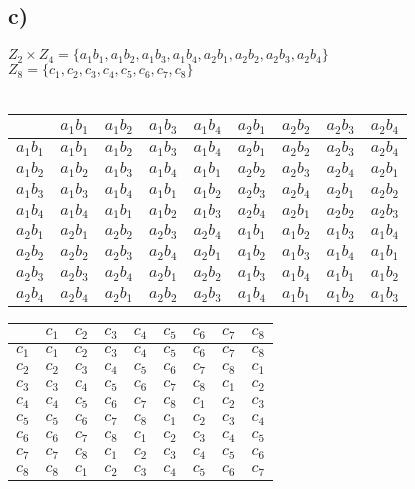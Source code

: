 \documentclass[]{scrartcl}
\begin{document}
\subsection{c)}
$Z_2\times Z_4 = \{a_1b_1, a_1b_2, a_1b_3, a_1b_4, a_2b_1, a_2b_2, a_2b_3, a_2b_4\}$\\
$Z_8 = \{c_1, c_2, c_3, c_4, c_5, c_6, c_7, c_8\}$\\\\
\begin{tabular}{|c||c|c|c|c|c|c|c|c|}
	\hline
	& $a_1b_1$ & $a_1b_2$ & $a_1b_3$ & $a_1b_4$ & $a_2b_1$ & $a_2b_2$ & $a_2b_3$ & $a_2b_4$\\\hline\hline
	$a_1b_1$ & $a_1b_1$ & $a_1b_2$ & $a_1b_3$ & $a_1b_4$ & $a_2b_1$ & $a_2b_2$ & $a_2b_3$ & $a_2b_4$ \\\hline
	$a_1b_2$ & $a_1b_2$ & $a_1b_3$ & $a_1b_4$ & $a_1b_1$ & $a_2b_2$ & $a_2b_3$ & $a_2b_4$ & $a_2b_1$ \\\hline
	$a_1b_3$ & $a_1b_3$ & $a_1b_4$ & $a_1b_1$ & $a_1b_2$ & $a_2b_3$ & $a_2b_4$ & $a_2b_1$ & $a_2b_2$\\\hline
	$a_1b_4$ & $a_1b_4$ & $a_1b_1$ & $a_1b_2$ & $a_1b_3$ & $a_2b_4$ & $a_2b_1$ & $a_2b_2$ & $a_2b_3$ \\\hline
	$a_2b_1$ & $a_2b_1$ & $a_2b_2$ & $a_2b_3$ & $a_2b_4$ & $a_1b_1$ & $a_1b_2$ & $a_1b_3$ & $a_1b_4$ \\\hline
	$a_2b_2$ & $a_2b_2$ & $a_2b_3$ & $a_2b_4$ & $a_2b_1$ & $a_1b_2$ & $a_1b_3$ & $a_1b_4$ & $a_1b_1$ \\\hline
	$a_2b_3$ & $a_2b_3$ & $a_2b_4$ & $a_2b_1$ & $a_2b_2$ & $a_1b_3$ & $a_1b_4$ & $a_1b_1$ & $a_1b_2$ \\\hline
	$a_2b_4$ & $a_2b_4$ & $a_2b_1$ & $a_2b_2$ & $a_2b_3$ & $a_1b_4$ & $a_1b_1$ & $a_1b_2$ & $a_1b_3$ \\\hline
\end{tabular}



\begin{tabular}{|c||c|c|c|c|c|c|c|c|}
	\hline
	& $c_1$ & $c_2$ & $c_3$ & $c_4$ & $c_5$ & $c_6$ & $c_7$ & $c_8$\\\hline\hline
	$c_1$ & $c_1$ & $c_2$ & $c_3$ & $c_4$ & $c_5$ & $c_6$ & $c_7$ & $c_8$ \\\hline
	$c_2$ & $c_2$ & $c_3$ & $c_4$ & $c_5$ & $c_6$ & $c_7$ & $c_8$ & $c_1$ \\\hline
	$c_3$ & $c_3$ & $c_4$ & $c_5$ & $c_6$ & $c_7$ & $c_8$ & $c_1$ & $c_2$ \\\hline
	$c_4$ & $c_4$ & $c_5$ & $c_6$ & $c_7$ & $c_8$ & $c_1$ & $c_2$ & $c_3$ \\\hline
	$c_5$ & $c_5$ & $c_6$ & $c_7$ & $c_8$ & $c_1$ & $c_2$ & $c_3$ & $c_4$ \\\hline
	$c_6$ & $c_6$ & $c_7$ & $c_8$ & $c_1$ & $c_2$ & $c_3$ & $c_4$ & $c_5$ \\\hline
	$c_7$ & $c_7$ & $c_8$ & $c_1$ & $c_2$ & $c_3$ & $c_4$ & $c_5$ & $c_6$ \\\hline
	$c_8$ & $c_8$ & $c_1$ & $c_2$ & $c_3$ & $c_4$ & $c_5$ & $c_6$ & $c_7$ \\\hline
\end{tabular}
\end{document}
